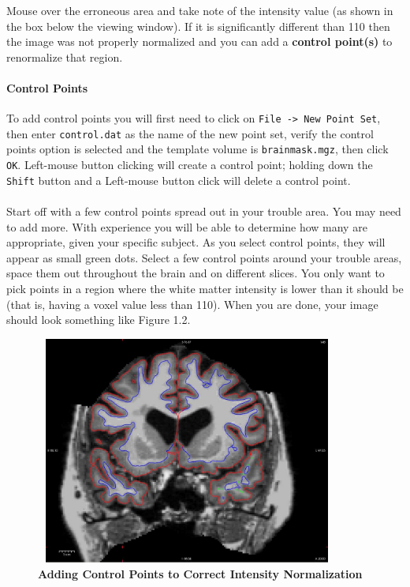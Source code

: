 \documentclass[paper=a4, fontsize=11pt]{scrartcl} %
\numberwithin{equation}{section} %
\numberwithin{figure}{section} %
\numberwithin{table}{section} %
\begin{document}
Mouse over the erroneous area and take note of the intensity value (as shown in the box below the viewing window).  If it is significantly different than 110 then the image was not properly normalized and you can add a \textbf{control point(s)} to renormalize that region. 

\paragraph{Control Points} To add control points you will first need to click on \texttt{File -> New Point Set}, then enter \texttt{control.dat} as the name of the new point set, verify the control points option is selected and the template volume is \texttt{brainmask.mgz}, then click \texttt{OK}. Left-mouse button clicking will create a control point; holding down the \texttt{Shift} button and a Left-mouse button click will delete a control point. 

\paragraph{}Start off with a few control points spread out in your trouble area. You may need to add more. With experience you will be able to determine how many are appropriate, given your specific subject.  As you select control points, they will appear as small green dots. Select a few control points around your trouble areas, space them out throughout the brain and on different slices. You only want to pick points in a region where the white matter intensity is lower than it should be (that is, having a voxel value less than 110).  When you are done, your image should look something like Figure 1.2.
\begin{centering}
\begin{figure}[h]
\includegraphics[width=10cm, height=7.5cm]{FS_cp_before_with}
\caption{\textbf{Adding Control Points to Correct Intensity Normalization}}
\end{figure}
\end{centering}
\end{document}
